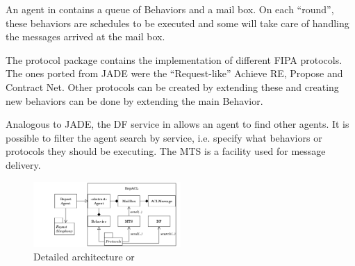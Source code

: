 An agent in \apiname{} contains a queue of Behaviors and a mail box. On each ``round'', these behaviors are schedules to be executed and some will take care of handling the messages arrived at the mail box.

The protocol package contains the implementation of different FIPA protocols. The ones ported from JADE were the ``Request-like'' Achieve RE, Propose and Contract Net. Other protocols can be created by extending these and creating new behaviors can be done by extending the main Behavior.

Analogous to JADE, the DF service in \apiname{} allows an agent to find other agents. It is possible to filter the agent search by service, i.e. specify what behaviors or protocols they should be executing. The MTS is a facility used for message delivery.


\begin{figure}[h]
	\centering
	\includegraphics[width=0.5\textwidth]{figures/repacl_arch.png}
	\caption{Detailed architecture or \apiname{}}
	\label{fig:arch}
\end{figure}

